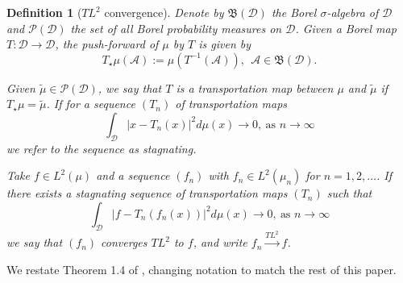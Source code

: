 \documentclass{article}
\newcommand{\abs}[1]{\left \lvert #1 \right \rvert}
\newcommand{\Dset}{\mathcal{D}}
\newcommand{\Aset}{\mathcal{A}}
\newcommand{\1}{\mathbf{1}}
\theoremstyle{alden}
\newtheorem{definition}{Definition}[section]
\theoremstyle{aldenthm}
\theoremstyle{remark}
\begin{document}
\begin{definition}[$TL^2$ convergence]
	Denote by $\mathfrak{B}(\Dset)$ the Borel $\sigma$-algebra of $\Dset$ and $\mathcal{P}(\Dset)$ the set of all Borel probability measures on $\Dset$. Given a Borel map $T: \Dset \to \Dset$, the \emph{push-forward} of $\mu$ by $T$ is given by
	\begin{equation*}
	T_{\star}\mu(\Aset) := \mu(T^{-1}(\Aset)), ~~ \Aset \in \mathfrak{B}(\Dset).
	\end{equation*}
	
	Given $\widetilde{\mu} \in \mathcal{P}(\Dset)$, we say that $T$ is a \emph{transportation map} between $\mu$ and $\widetilde{\mu}$ if $T_{\star}\mu = \widetilde{\mu}$. If for a sequence $(T_n)$ of transportation maps
	\begin{equation*}
	\int_{\Dset} \abs{x - T_n(x)}^2 d\mu(x) \to 0,~ \text{as $n \to \infty$}
	\end{equation*}
	we refer to the sequence as \emph{stagnating.} 
	
	Take $f \in L^2(\mu)$ and a sequence $(f_n)$ with $f_n \in L^2(\mu_n)$ for $n = 1,2,\ldots$. If there exists a stagnating sequence of transportation maps $(T_n)$ such that
	\begin{equation*}
	\int_{\Dset} \abs{ f - T_n(f_n(x)) }^2 d\mu(x) \to 0,~ \text{as $n \to \infty$}
	\end{equation*}
	we say that $(f_n)$ converges $TL^2$ to $f$, and write $f_n \overset{TL^2}{\to} f$.
\end{definition}

We restate Theorem 1.4 of \cite{trillos2018}, changing notation to match the rest of this paper.
\end{document}
